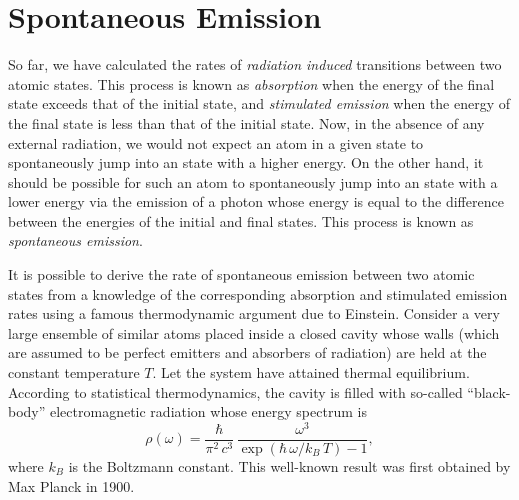 \section{Spontaneous Emission}\label{s13.9}
So far, we have calculated the  rates of {\em radiation induced}\/ transitions
between two  atomic states. This process is known as {\em absorption}\/ when the energy of the final state exceeds that
of the initial state, and {\em stimulated emission}\/ when the energy of the final state is less than that
of the initial state. Now, in the absence of any external radiation, we would
not expect an atom in a given state to spontaneously jump into an
state with a higher energy. On the other hand, it should be possible for
such an atom to spontaneously jump into an state with a lower energy
via the emission of a photon whose energy is equal to the difference
between the energies of the initial and final states. This process is known as {\em spontaneous emission}.

It is possible to derive the  rate of spontaneous emission between two atomic states
from a knowledge of the corresponding absorption and stimulated
emission rates using a famous thermodynamic argument due to Einstein.
Consider a very large ensemble of similar atoms placed inside a closed cavity whose walls (which are assumed to be perfect emitters and absorbers of radiation) are held at
the constant temperature $T$. Let the system have attained thermal equilibrium.
According to statistical thermodynamics, the cavity is filled with so-called ``black-body'' electromagnetic
radiation whose energy spectrum is
\begin{equation}\label{e13.109}
\rho(\omega) = \frac{\hbar}{\pi^2\,c^3}\,\frac{\omega^3}{\exp(\hbar\,\omega/k_B\,T)-1},
\end{equation}
where $k_B$ is the Boltzmann constant. This well-known result was first
obtained by Max Planck in 1900.

